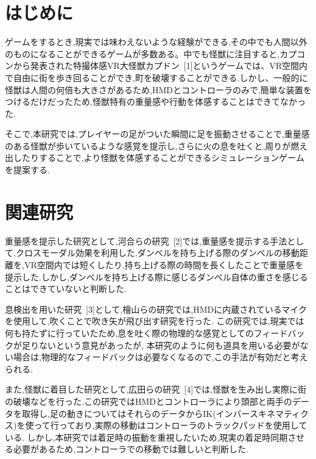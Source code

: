 \documentclass[uplatex]{jsarticle}   %
\begin{document}

\vspace{3mm}

\setcounter{page}{1}



\section{はじめに}
ゲームをするとき,現実では味わえないような経験ができる.その中でも人間以外のものになることができるゲームが多数ある。中でも怪獣に注目すると,カプコンから発表された特撮体感VR大怪獣カプドン~[1]というゲームでは、VR空間内で自由に街を歩き回ることができ,町を破壊することができる.しかし、一般的に怪獣は人間の何倍も大きさがあるため,HMDとコントローラのみで,簡単な装置をつけるだけだったため,怪獣特有の重量感や行動を体感することはできてなかった.

そこで,本研究では,プレイヤーの足がついた瞬間に足を振動させることで,重量感のある怪獣が歩いているような感覚を提示し,さらに火の息を吐くと,周りが燃え出したりすることで,より怪獣を体感することができるシミュレーションゲームを提案する.

\section{関連研究}
重量感を提示した研究として,河合らの研究~[2]では,重量感を提示する手法として,クロスモーダル効果を利用した.ダンベルを持ち上げる際のダンベルの移動距離を,VR空間内では短くしたり,持ち上げる際の時間を長くしたことで重量感を提示した.しかし,ダンベルを持ち上げる際に感じるダンベル自体の重さを感じることはできていないと判断した.

息検出を用いた研究~[3]として,檜山らの研究では,HMDに内蔵されているマイクを使用して,吹くことで吹き矢が飛び出す研究を行った.
この研究では,現実では何も持たずに行っていたため,息を吐く際の物理的な感覚としてのフィードバックが足りないという意見があったが,
本研究のように何も道具を用いる必要がない場合は,物理的なフィードバックは必要なくなるので,この手法が有効だと考えられる.

また,怪獣に着目した研究として,広田らの研究~[4]では,怪獣を生み出し実際に街の破壊などを行った.この研究ではHMDとコントローラにより頭部と両手のデータを取得し,足の動きについてはそれらのデータからIK(インバースキネマティクス)を使って行っており,実際の移動はコントローラのトラックパッドを使用している.
しかし,本研究では着足時の振動を重視したいため,現実の着足時同期させる必要があるため,コントローラでの移動では難しいと判断した.
\end{document}
